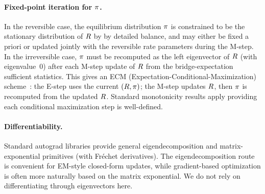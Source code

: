 \paragraph{Fixed-point iteration for $\pi$.}
In the reversible case, the equilibrium distribution $\pi$ is
constrained to be the stationary distribution of $R$ by
by detailed balance, and may either be fixed a priori or updated jointly with the reversible rate parameters during the M-step.
In the irreversible case, $\pi$ must be recomputed as the
left eigenvector of $R$ (with eigenvalue~0) after each
M-step update of $R$ from the bridge-expectation sufficient statistics.
This gives an ECM (Expectation-Conditional-Maximization)
scheme~\cite{MengRubin1993}:
the E-step uses the current $(R, \pi)$;
the M-step updates $R$, then $\pi$ is recomputed from
the updated $R$.
Standard monotonicity results apply providing each conditional maximization step is well-defined.

\paragraph{Differentiability.}

Standard autograd libraries provide general eigendecomposition and matrix-exponential primitives (with Fréchet derivatives).
The eigendecomposition route is convenient for EM-style closed-form updates, while gradient-based optimization is often more naturally based on the matrix exponential. We do not rely on differentiating through eigenvectors here.
